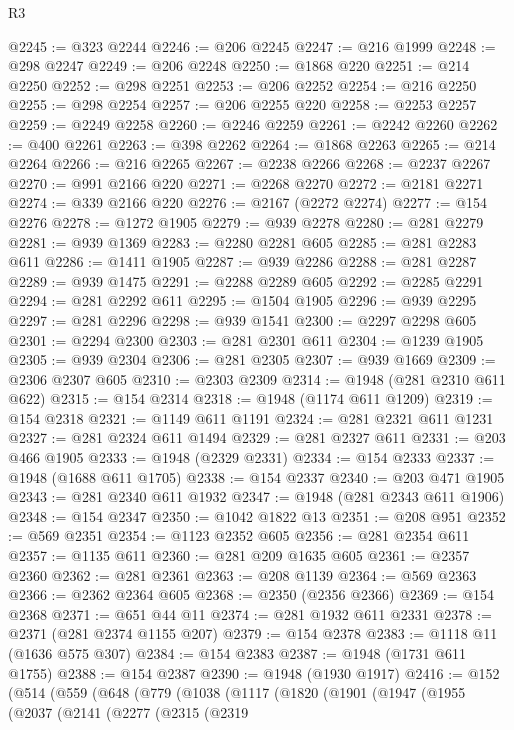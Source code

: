 \begin{lexlean}{R3}
\begin{coremodule}
@2245 := @323 @2244
@2246 := @206 @2245
@2247 := @216 @1999
@2248 := @298 @2247
@2249 := @206 @2248
@2250 := @1868 @220
@2251 := @214 @2250
@2252 := @298 @2251
@2253 := @206 @2252
@2254 := @216 @2250
@2255 := @298 @2254
@2257 := @206 @2255 @220
@2258 := @2253 @2257
@2259 := @2249 @2258
@2260 := @2246 @2259
@2261 := @2242 @2260
@2262 := @400 @2261
@2263 := @398 @2262
@2264 := @1868 @2263
@2265 := @214 @2264
@2266 := @216 @2265
@2267 := @2238 @2266
@2268 := @2237 @2267
@2270 := @991 @2166 @220
@2271 := @2268 @2270
@2272 := @2181 @2271
@2274 := @339 @2166 @220
@2276 := @2167 (@2272 @2274)
@2277 := @154 @2276
@2278 := @1272 @1905
@2279 := @939 @2278
@2280 := @281 @2279
@2281 := @939 @1369
@2283 := @2280 @2281 @605
@2285 := @281 @2283 @611
@2286 := @1411 @1905
@2287 := @939 @2286
@2288 := @281 @2287
@2289 := @939 @1475
@2291 := @2288 @2289 @605
@2292 := @2285 @2291
@2294 := @281 @2292 @611
@2295 := @1504 @1905
@2296 := @939 @2295
@2297 := @281 @2296
@2298 := @939 @1541
@2300 := @2297 @2298 @605
@2301 := @2294 @2300
@2303 := @281 @2301 @611
@2304 := @1239 @1905
@2305 := @939 @2304
@2306 := @281 @2305
@2307 := @939 @1669
@2309 := @2306 @2307 @605
@2310 := @2303 @2309
@2314 := @1948 (@281 @2310 @611 @622)
@2315 := @154 @2314
@2318 := @1948 (@1174 @611 @1209)
@2319 := @154 @2318
@2321 := @1149 @611 @1191
@2324 := @281 @2321 @611 @1231
@2327 := @281 @2324 @611 @1494
@2329 := @281 @2327 @611
@2331 := @203 @466 @1905
@2333 := @1948 (@2329 @2331)
@2334 := @154 @2333
@2337 := @1948 (@1688 @611 @1705)
@2338 := @154 @2337
@2340 := @203 @471 @1905
@2343 := @281 @2340 @611 @1932
@2347 := @1948 (@281 @2343 @611 @1906)
@2348 := @154 @2347
@2350 := @1042 @1822 @13
@2351 := @208 @951
@2352 := @569 @2351
@2354 := @1123 @2352 @605
@2356 := @281 @2354 @611
@2357 := @1135 @611
@2360 := @281 @209 @1635 @605
@2361 := @2357 @2360
@2362 := @281 @2361
@2363 := @208 @1139
@2364 := @569 @2363
@2366 := @2362 @2364 @605
@2368 := @2350 (@2356 @2366)
@2369 := @154 @2368
@2371 := @651 @44 @11
@2374 := @281 @1932 @611 @2331
@2378 := @2371 (@281 @2374 @1155 @207)
@2379 := @154 @2378
@2383 := @1118 @11 (@1636 @575 @307)
@2384 := @154 @2383
@2387 := @1948 (@1731 @611 @1755)
@2388 := @154 @2387
@2390 := @1948 (@1930 @1917)
@2416 := @152
    (@514
      (@559
        (@648
          (@779
            (@1038
              (@1117
                (@1820
                  (@1901
                    (@1947
                      (@1955
                        (@2037
                          (@2141
                            (@2277
                              (@2315
                                (@2319

\end{coremodule}
\end{lexlean}
